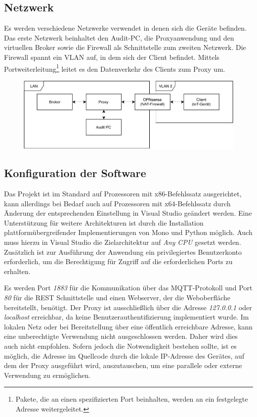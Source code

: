     \subsection{Netzwerk}
    Es werden verschiedene Netzwerke verwendet in denen sich die Geräte befinden. 
    Das erste Netzwerk beinhaltet den Audit-PC, die Proxyanwendung und den virtuellen Broker sowie die Firewall als Schnittstelle zum zweiten Netzwerk.
    Die Firewall spannt ein \ac{VLAN} auf, in dem sich der Client befindet. Mittels Portweiterleitung\footnote{Pakete, die an einen spezifizierten Port beinhalten, werden an ein festgelegte Adresse weitergeleitet.} leitet es den Datenverkehr des Clients zum Proxy um.
    
    \begin{figure}[h]%
        \centering
        \includegraphics[width=14cm]{tex/bilder/6_validierung/Netzwerkdiagramm.pdf}
        \label{fig:virtuelles_netzwerk}
    \end{figure}
    
    \subsection{Konfiguration der Software} \label{KonfigurationDerSoftware}
    Das Projekt ist im Standard auf Prozessoren mit x86-Befehlssatz ausgerichtet, kann allerdings bei Bedarf auch auf Prozessoren mit x64-Befehlssatz durch Änderung der entsprechenden Einstellung in Visual Studio geändert werden.
    Eine Unterstützung für weitere Architekturen ist durch die Installation plattformübergreifender Implementierungen von Mono und Python möglich. Auch muss hierzu in Visual Studio die Zielarchitektur auf \emph{Any CPU} gesetzt werden. 
    Zusätzlich ist zur Ausführung der Anwendung ein privilegiertes Benutzerkonto erforderlich, um die Berechtigung für Zugriff auf die erforderlichen Ports zu erhalten.
    
    Es werden Port \emph{1883} für die Kommunikation über das \ac{MQTT}-Protokoll und Port \emph{80} für die \ac{REST} Schnittstelle und einen Webserver, der die Weboberfläche bereitstellt, benötigt.
    Der Proxy ist ausschließlich über die Adresse \emph{127.0.0.1} oder \emph{localhost} erreichbar, da keine Benutzerauthentifizierung implementiert wurde. Im lokalen Netz oder bei Bereitstellung über eine öffentlich erreichbare Adresse, kann eine unberechtigte Verwendung nicht ausgeschlossen werden. Daher wird dies auch nicht empfohlen. Sofern jedoch die Notwendigkeit bestehen sollte, ist es möglich, die Adresse im Quellcode durch die lokale IP-Adresse des Gerätes, auf dem der Proxy ausgeführt wird, auszutauschen, um eine parallele oder externe Verwendung zu ermöglichen.

